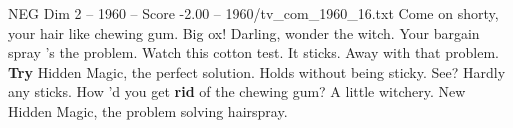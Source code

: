 \begin{textsample}{NEG Dim 2 – 1960 – Score -2.00 – 1960/tv\_com\_1960\_16.txt}  \label{ex:f2_neg_076}
Come on shorty, your hair like chewing gum.
Big ox!
Darling, wonder the witch.
Your bargain spray 's the problem.
Watch this cotton test.
It sticks.
Away with that problem. \textbf{Try} Hidden Magic, the perfect solution.
Holds without being sticky.
See?
Hardly any sticks.
How 'd you get \textbf{rid} of the chewing gum?
A little witchery.
New Hidden Magic, the problem solving hairspray.

\end{textsample}
